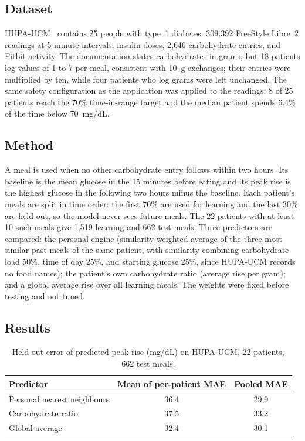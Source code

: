 \subsection{Dataset}
HUPA-UCM~\cite{hupa2024} contains 25 people with type~1 diabetes: 309{,}392 FreeStyle Libre~2 readings at 5-minute intervals, insulin doses, 2{,}646 carbohydrate entries, and Fitbit activity. The documentation states carbohydrates in grams, but 18 patients log values of 1 to 7 per meal, consistent with 10~g exchanges; their entries were multiplied by ten, while four patients who log grams were left unchanged. The same safety configuration as the application was applied to the readings: 8 of 25 patients reach the 70\% time-in-range target and the median patient spends 6.4\% of the time below 70~mg/dL.

\subsection{Method}
A meal is used when no other carbohydrate entry follows within two hours. Its baseline is the mean glucose in the 15 minutes before eating and its peak rise is the highest glucose in the following two hours minus the baseline. Each patient's meals are split in time order: the first 70\% are used for learning and the last 30\% are held out, so the model never sees future meals. The 22 patients with at least 10 such meals give 1{,}519 learning and 662 test meals. Three predictors are compared: the personal engine (similarity-weighted average of the three most similar past meals of the same patient, with similarity combining carbohydrate load 50\%, time of day 25\%, and starting glucose 25\%, since HUPA-UCM records no food names); the patient's own carbohydrate ratio (average rise per gram); and a global average rise over all learning meals. The weights were fixed before testing and not tuned.

\subsection{Results}
\begin{table}[h]
\centering
\begin{tabular}{lcc}
\hline
Predictor & Mean of per-patient MAE & Pooled MAE \\
\hline
Personal nearest neighbours & 36.4 & 29.9 \\
Carbohydrate ratio & 37.5 & 33.2 \\
Global average & 32.4 & 30.1 \\
\hline
\end{tabular}
\caption{Held-out error of predicted peak rise (mg/dL) on HUPA-UCM, 22 patients, 662 test meals.}
\end{table}

